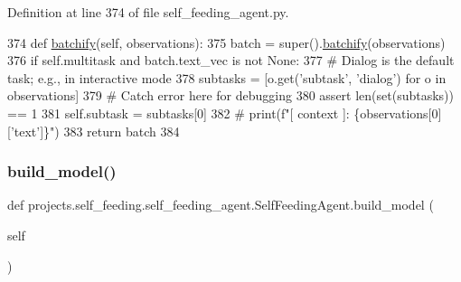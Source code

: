 Definition at line 374 of file self\+\_\+feeding\+\_\+agent.\+py.


\begin{DoxyCode}
374     \textcolor{keyword}{def }\hyperlink{namespaceparlai_1_1agents_1_1drqa_1_1utils_aca22dd97c5b6dcda2a7479c1cb22ef1e}{batchify}(self, observations):
375         batch = super().\hyperlink{namespaceparlai_1_1agents_1_1drqa_1_1utils_aca22dd97c5b6dcda2a7479c1cb22ef1e}{batchify}(observations)
376         \textcolor{keywordflow}{if} self.multitask \textcolor{keywordflow}{and} batch.text\_vec \textcolor{keywordflow}{is} \textcolor{keywordflow}{not} \textcolor{keywordtype}{None}:
377             \textcolor{comment}{# Dialog is the default task; e.g., in interactive mode}
378             subtasks = [o.get(\textcolor{stringliteral}{'subtask'}, \textcolor{stringliteral}{'dialog'}) \textcolor{keywordflow}{for} o \textcolor{keywordflow}{in} observations]
379             \textcolor{comment}{# Catch error here for debugging}
380             \textcolor{keyword}{assert} len(set(subtasks)) == 1
381             self.subtask = subtasks[0]
382         \textcolor{comment}{# print(f"[ context ]: \{observations[0]['text']\}")}
383         \textcolor{keywordflow}{return} batch
384 
\end{DoxyCode}
\mbox{\label{classprojects_1_1self__feeding_1_1self__feeding__agent_1_1SelfFeedingAgent_af80537d5c439bd9c475e252e533e24cc}} 
\subsubsection{\texorpdfstring{build\+\_\+model()}{build\_model()}}
{\footnotesize\ttfamily def projects.\+self\+\_\+feeding.\+self\+\_\+feeding\+\_\+agent.\+Self\+Feeding\+Agent.\+build\+\_\+model (\begin{DoxyParamCaption}\item[{}]{self }\end{DoxyParamCaption})}



